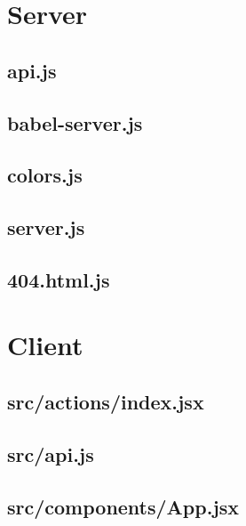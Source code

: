 \section{Server}
\label{app:web_server}
\subsection{api.js}
\label{app:server_api_js}

\subsection{babel-server.js}
\label{app:server_babel_server_js}

\subsection{colors.js}
\label{app:server_colors_js}

\subsection{server.js}
\label{app:server_server_js}

\subsection{404.html.js}
\label{app:server_404_html}

\section{Client}
\label{app:web_client}
\subsection{src/actions/index.jsx}
\label{app:client_src_actions_index_jsx}

\subsection{src/api.js}
\label{app:client_src_api_js}

\subsection{src/components/App.jsx}
\label{app:client_src_components_App_jsx}

